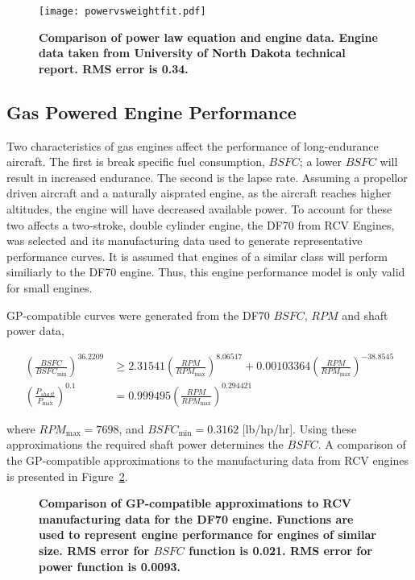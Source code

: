 \documentclass[]{aiaa-tc}%
\begin{document}
\begin{figure}[H]
	\begin{center}
	\texttt{[image: powervsweightfit.pdf]}
    \caption{ \textbf{ Comparison of power law equation and engine data.  Engine data taken from University of North Dakota technical report.\cite{gasengine} RMS error is 0.34.}}
	\label{f:powervsweightfit}
	\end{center}
\end{figure}

\subsection{Gas Powered Engine Performance}

Two characteristics of gas engines affect the performance of long-endurance aircraft.  
The first is break specific fuel consumption, $BSFC$; a lower $BSFC$ will result in increased endurance.  
The second is the lapse rate.  
Assuming a propellor driven aircraft and a naturally aisprated engine, as the aircraft reaches higher altitudes, the engine will have decreased available power. 
To account for these two affects a two-stroke, double cylinder engine, the DF70 from RCV Engines, was selected and its manufacturing data used to generate representative performance curves.  
It is assumed that engines of a similar class will perform similiarly to the DF70 engine.  
Thus, this engine performance model is only valid for small engines.

GP-compatible curves were generated from the DF70 $BSFC$, $RPM$ and shaft power data, 

\begin{align}
    \label{e:rpmtobsfc}
    \left( \frac{BSFC}{BSFC_{\text{min}}} \right)^{36.2209} &\geq 2.31541\left( \frac{RPM}{RPM_{\text{max}}}\right)^{8.06517} + 0.00103364\left( \frac{RPM}{RPM_{\text{max}}} \right)^{-38.8545} \\
    \label{e:rpmtopower}
    \left( \frac{P_{shaft}}{P_{\text{max}}}\right)^{0.1} &= 0.999495\left( \frac{RPM}{RPM_{\text{max}}}\right)^{0.294421}
\end{align}

where $RPM_{\text{max}} = 7698$, and $BSFC_{\text{min}} = 0.3162$ [lb/hp/hr]. 
Using these approximations the required shaft power determines the $BSFC$.
A comparison of the GP-compatible approximations to the manufacturing data from RCV engines is presented in Figure~\ref{f:RCVdata}.

\begin{figure}[H]
 \begin{subfigmatrix}{2}%
 \end{subfigmatrix}
 \caption{\textbf{Comparison of GP-compatible approximations to RCV manufacturing data for the DF70 engine.  Functions are used to represent engine performance for engines of similar size.  RMS error for $BSFC$ function is 0.021.  RMS error for power function is 0.0093. }}
 \label{f:RCVdata}
\end{figure}
\end{document}
